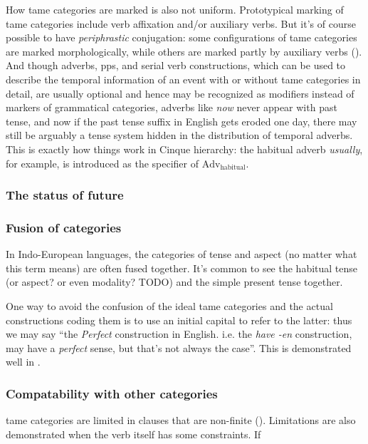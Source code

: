 \documentclass[UTF8, a4paper, oneside, scheme=plain]{ctexart}
\newcommand*{\citepage}[1]{pp.~{#1}}
\newcommand*{\term}[1]{\emph{#1}}
\newcommand*{\corpus}[1]{\emph{#1}}
\begin{document}
How \ac{tame} categories are marked is also not uniform.
Prototypical marking of \ac{tame} categories include 
verb affixation and/or auxiliary verbs.
But it's of course possible to have \emph{periphrastic} conjugation:
some configurations of \ac{tame} categories are marked morphologically,
while others are marked partly by auxiliary verbs ().
And though adverbs, \acs{pp}s, and serial verb constructions,
which can be used to describe the temporal information of an event 
with or without \ac{tame} categories in detail,
are usually optional 
and hence may be recognized as modifiers instead of markers of grammatical categories,
adverbs like \corpus{now} never appear with past tense,
and now if the past tense suffix in English gets eroded one day,
there may still be arguably a tense system
hidden in the distribution of temporal adverbs.
This is exactly how things work in Cinque hierarchy:
the habitual adverb \corpus{usually}, for example,
is introduced as the specifier of $\text{Adv}_{\text{habitual}}$.


\subsubsection{The status of future}

\subsubsection{Fusion of categories}\label{sec:fusion-of-tame}

In Indo-European languages, the categories of tense and aspect (no matter what this term means)
are often fused together.
It's common to see the habitual tense (or aspect? or even modality? TODO) 
and the simple present tense together.

One way to avoid the confusion of the ideal \ac{tame} categories 
and the actual constructions coding them 
is to use an initial capital to refer to the latter:
thus we may say ``the \term{Perfect} construction in English. i.e. the \corpus{have -en} construction,
may have a \term{perfect} sense, but that's not always the case''.
This is demonstrated well in \citet[\citepage{1091}]{jacques2021grammar}.

\subsubsection{Compatability with other categories}

\ac{tame} categories are limited in clauses 
that are non-finite ().
Limitations are also demonstrated when the verb itself has some constraints.
If 
\end{document}

